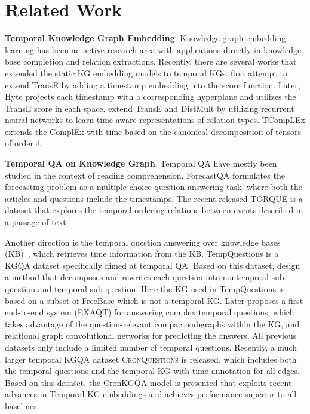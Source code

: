 \documentclass[11pt]{article}
\newcommand{\xhdr}[1]{{\noindent\bfseries #1}.}
\begin{document}
\section{Related Work}


\xhdr{Temporal Knowledge Graph Embedding}
Knowledge graph embedding learning \cite{bordes2013translating,yang2014embedding, trouillon2016complex, dettmers2018convolutional,shang2019end,sun2019rotate,tang2019orthogonal,ji2021survey} has been an active research area with applications directly in knowledge base completion and relation extractions.
Recently, there are several works that extended the static KG embedding models to temporal KGs. \citet{jiang2016towards} first attempt to extend TransE \cite{bordes2013translating} by adding a timestamp embedding into the score function. Later, Hyte \cite{dasgupta2018hyte} projects each timestamp with a corresponding hyperplane and utilizes the TransE score in each space. \citet{garcia2018learning} extend TransE and DistMult by utilizing recurrent neural networks to learn time-aware representations of relation types.
TCompLEx \cite{lacroix2020tensor} extends the ComplEx with time based on the canonical decomposition of tensors of order 4.


\xhdr{Temporal QA on Knowledge Graph}
Temporal QA have mostly been studied
in the context of reading comprehension. 
ForecastQA \cite{jin2021forecastqa} formulates the forecasting problem as a multiple-choice question answering task, where both the articles and questions include the timestamps. The recent released TORQUE \cite{ning2020torque} is a dataset that explores the temporal ordering relations between events described in a passage of text. 

Another direction is the temporal question answering over knowledge bases (KB)~\cite{jia2018tequila,jia2018tempquestions}, which retrieves time information from the KB. TempQuestions \cite{jia2018tempquestions} is a KGQA dataset specifically aimed at temporal QA. 
Based on this dataset, \citet{jia2018tequila} design a method that decomposes and rewrites each question into nontemporal sub-question and temporal sub-question. Here the KG used in TempQuestions is based on a subset of FreeBase which is not a temporal KG. Later \citet{jia2021complex} proposes a first end-to-end system (EXAQT) for answering complex temporal questions, which takes advantage of the question-relevant compact subgraphs within the KG, and relational graph convolutional networks \cite{schlichtkrull2018modeling} for predicting the answers. All previous datasets only include a limited number of temporal questions. 
Recently, a much larger temporal KGQA dataset \textsc{CronQuestions} \cite{saxena2021question} is released, which includes both the temporal questions and the temporal KG with time annotation for all edges.
Based on this dataset, the CronKGQA model \cite{saxena2021question} is presented that exploits recent advances in Temporal KG embeddings and achieves performance superior to all baselines. 
\end{document}
